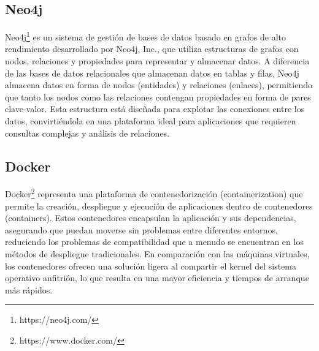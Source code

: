\subsection{Neo4j}

Neo4j\footnote{https://neo4j.com/} es un sistema de gestión de bases de datos basado en grafos de alto rendimiento desarrollado por 
Neo4j, Inc., 
que utiliza estructuras de grafos con nodos, relaciones y propiedades para representar y almacenar datos. A 
diferencia de las bases de datos relacionales que almacenan datos en tablas y filas, Neo4j almacena datos en 
forma de nodos (entidades) y relaciones (enlaces), permitiendo que tanto los nodos como las relaciones contengan 
propiedades en forma de pares clave-valor. Esta estructura está diseñada para explotar las conexiones entre 
los datos, convirtiéndola en una plataforma ideal para aplicaciones que requieren consultas complejas y 
análisis de relaciones. 

\subsection{Docker}

Docker\footnote{https://www.docker.com/} representa una plataforma de contenedorización (containerization) que permite la creación, despliegue y ejecución de aplicaciones 
dentro de contenedores (containers). Estos contenedores encapsulan la aplicación y sus dependencias, asegurando que puedan moverse 
sin problemas entre diferentes entornos, reduciendo los problemas de compatibilidad que a menudo se encuentran en los métodos de despliegue 
tradicionales. En comparación con las máquinas virtuales, los contenedores ofrecen una 
solución ligera al compartir el kernel del sistema operativo anfitrión, lo que resulta en una mayor eficiencia y 
tiempos de arranque más rápidos. 